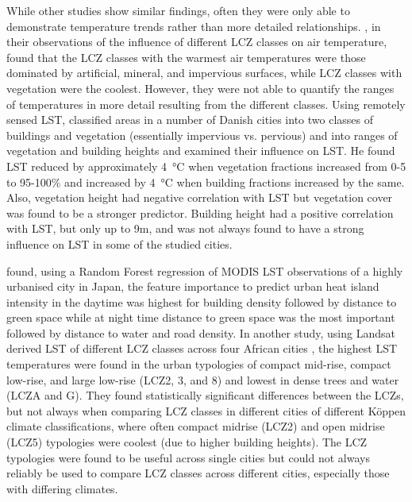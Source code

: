 \documentclass[final,3p,times,authoryear]{elsarticle}
\begin{document}
While other studies show similar findings, often they were only able to demonstrate temperature trends rather than more detailed relationships. \cite{Emery2021}, in their observations of the influence of different LCZ classes on air temperature, found that the LCZ classes with the warmest air temperatures were those dominated by artificial, mineral, and impervious surfaces, while LCZ classes with vegetation were the coolest. However, they were not able to quantify the ranges of temperatures in more detail resulting from the different classes. Using remotely sensed LST, \cite{Alexander2021} classified areas in a number of Danish cities into two classes of buildings and vegetation (essentially impervious vs. pervious) and into ranges of vegetation and building heights and examined their influence on LST. He found LST reduced by approximately 4\SI{}{\degreeCelsius} when vegetation fractions increased from 0-5 to 95-100\% and increased by 4\SI{}{\degreeCelsius} when building fractions increased by the same. Also, vegetation height had negative correlation with LST but vegetation cover was found to be a stronger predictor. Building height had a positive correlation with LST, but only up to 9m, and was not always found to have a strong influence on LST in some of the studied cities. 

\cite{Peng2022} found, using a Random Forest regression of MODIS LST observations of a highly urbanised city in Japan, the feature importance to predict urban heat island intensity in the daytime was highest for building density followed by distance to green space while at night time distance to green space was the most important followed by distance to water and road density. In another study, using Landsat derived LST of different LCZ classes across four African cities \citep{Li2022}, the highest LST temperatures were found in the urban typologies of compact mid-rise, compact low-rise, and large low-rise (LCZ2, 3, and 8) and lowest in dense trees and water (LCZA and G). They found statistically significant differences between the LCZs, but not always when comparing LCZ classes in different cities of different K\"{o}ppen climate classifications, where often compact midrise (LCZ2) and open midrise (LCZ5) typologies were coolest (due to higher building heights). The LCZ typologies were found to be useful across single cities but could not always reliably be used to compare LCZ classes across different cities, especially those with differing climates.
\end{document}
